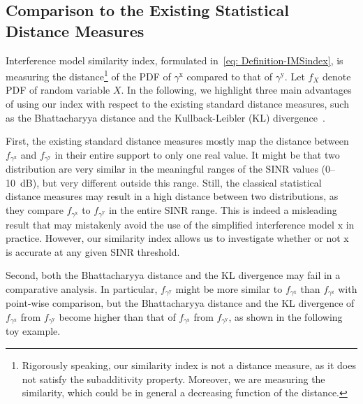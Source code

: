 \documentclass[12pt, draftclsnofoot, onecolumn]{IEEEtran}
\begin{document}
\subsection{Comparison to the Existing Statistical Distance Measures}
Interference model similarity index, formulated in~\eqref{eq: Definition-IMSindex}, is measuring the distance\footnote{Rigorously speaking, our similarity index is not a distance measure, as it does not satisfy the subadditivity property. Moreover, we are measuring the similarity, which could be in general a decreasing function of the distance.} of the PDF of $\gamma^{\mathrm{x}}$ compared to that of $\gamma^{\mathrm{y}}$. Let $f_{X}$ denote PDF of random variable $X$.
In the following, we highlight three main advantages of using our index with respect to the existing standard distance measures, such as the Bhattacharyya distance and the Kullback-Leibler (KL) divergence~\cite{Kailath1967Bhattacharyya}.

First, the existing standard distance measures mostly map the distance between $f_{\gamma^{\mathrm{x}}}$ and $f_{\gamma^{\mathrm{y}}}$ in their entire support to only one real value. It might be that two distribution are very similar in the meaningful ranges of the SINR values (0--10~dB), but very different outside this range. Still, the classical statistical distance measures may result in a high distance between two distributions, as they compare $f_{\gamma^{\mathrm{x}}}$ to $f_{\gamma^{\mathrm{y}}}$ in the entire SINR range. This is indeed a misleading result that may mistakenly avoid the use of the simplified interference model $\mathrm{x}$ in practice.
However, our similarity index allows us to investigate whether or not $\mathrm{x}$ is accurate at any given SINR threshold.

Second, both the Bhattacharyya distance and the KL divergence may fail in a comparative analysis. In particular, $f_{\gamma^{\mathrm{y}}}$ might be more similar to $f_{\gamma^{\mathrm{x}}}$ than $f_{\gamma^{\mathrm{z}}}$ with point-wise comparison, but the  Bhattacharyya distance and the KL divergence of $f_{\gamma^{\mathrm{x}}}$ from $f_{\gamma^{\mathrm{y}}}$ become higher than that of $f_{\gamma^{\mathrm{z}}}$ from $f_{\gamma^{\mathrm{y}}}$, as shown in the following toy example.
\end{document}
